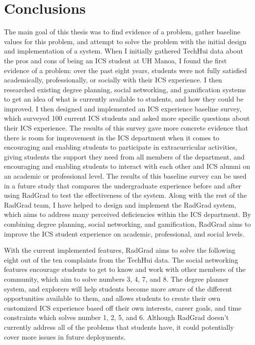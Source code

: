 \chapter{Conclusions}

The main goal of this thesis was to find evidence of a problem, gather baseline values for this problem, and attempt to solve the problem with the initial design and implementation of a system. When I initially gathered TechHui data about the pros and cons of being an ICS student at UH Manoa, I found the first evidence of a problem: over the past eight years, students were not fully satisfied academically, professionally, or socially with their ICS experience. I then researched existing degree planning, social networking, and gamification systems to get an idea of what is currently available to students, and how they could be improved. I then designed and implemented an ICS experience baseline survey, which surveyed 100 current ICS students and asked more specific questions about their ICS experience. The results of this survey gave more concrete evidence that there is room for improvement in the ICS department when it comes to encouraging and enabling students to participate in extracurricular activities, giving students the support they need from all members of the department, and encouraging and enabling students to interact with each other and ICS alumni on an academic or professional level. The results of this baseline survey can be used in a future study that compares the undergraduate experience before and after using RadGrad to test the effectiveness of the system. Along with the rest of the RadGrad team, I have helped to design and implement the RadGrad system, which aims to address many perceived deficiencies within the ICS department. By combining degree planning, social networking, and gamification, RadGrad aims to improve the ICS student experience on academic, professional, and social levels. 

With the current implemented features, RadGrad aims to solve the following eight out of the ten complaints from the TechHui data. The social networking features encourage students to get to know and work with other members of the community, which aim to solve numbers 3, 4, 7, and 8. The degree planner system, and explorers will help students become more aware of the different opportunities available to them, and allows students to create their own customized ICS experience based off their own interests, career goals, and time constraints which solves number 1, 2, 5, and 6. Although RadGrad doesn't currently address all of the problems that students have, it could potentially cover more issues in future deployments. 

